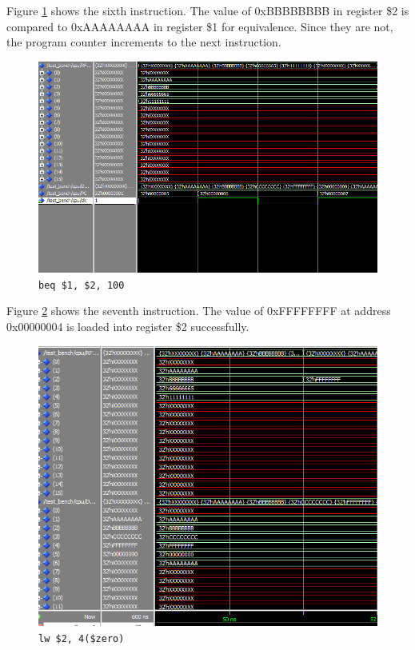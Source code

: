 \documentclass[12pt]{article}
\begin{document}
Figure \ref{fig:6-instr} shows the sixth instruction. The value of 0xBBBBBBBB in register \$2 is compared to 0xAAAAAAAA in register \$1 for equivalence. Since they are not, the program counter increments to the next instruction.
\begin{figure}[H]
\centering
\includegraphics[width=\linewidth]{simulation/6-instr}
\caption{\texttt{beq \$1, \$2, 100}}
\label{fig:6-instr}
\end{figure}


Figure \ref{fig:7-instr} shows the seventh instruction. The value of 0xFFFFFFFF at address 0x00000004 is loaded into register \$2 successfully.
\begin{figure}[H]
\centering
\includegraphics[width=\linewidth]{simulation/7-instr}
\caption{\texttt{lw \$2, 4(\$zero)}}
\label{fig:7-instr}
\end{figure}
\end{document}
